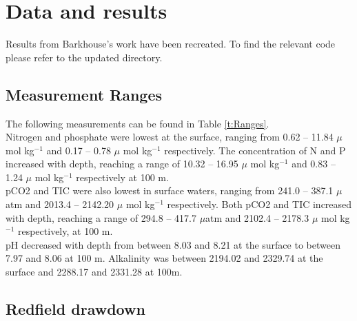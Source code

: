 \documentclass[journal, a4paper]{article} %
\begin{document}
\section{Data and results}

Results from Barkhouse's work have been recreated. To find the relevant code please refer to the updated directory. 
\subsection{Measurement Ranges}
The following measurements can be found in Table \ref{t:Ranges}. 
\\[12pt]
Nitrogen and phosphate were lowest at the surface, ranging from 0.62 – 11.84 $\mu$ mol kg$^{-1}$ and 0.17 – 0.78 $\mu$ mol kg$^{-1}$ respectively. The concentration of N and P increased with depth, reaching a range of 10.32 – 16.95 $\mu$ mol kg$^{-1}$ and 0.83 – 1.24 $\mu$ mol kg$^{-1}$ respectively at 100 m. 
\\[12pt]
pCO2 and TIC were also lowest in surface waters, ranging from 241.0 – 387.1 $\mu$atm and 2013.4 – 2142.20 $\mu$ mol kg$^{-1}$ respectively. Both pCO2 and TIC increased with depth, reaching a range of 294.8 – 417.7 $\mu$atm and 2102.4 – 2178.3 $\mu$ mol kg$^{-1}$ respectively, at 100 m. 
\\[12pt]
pH decreased with depth from between 8.03 and 8.21 at the surface to between 7.97 and 8.06 at 100 m. Alkalinity was between 2194.02 and 2329.74 at the surface and 2288.17 and 2331.28 at 100m. 


\subsection{Redfield drawdown}
\end{document}
